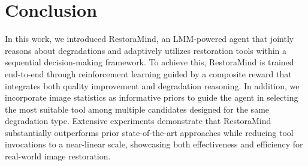 \section{Conclusion}
In this work, we introduced RestoraMind, an LMM-powered agent that jointly reasons about degradations and adaptively utilizes restoration tools within a sequential decision-making framework. To achieve this, RestoraMind is trained end-to-end through reinforcement learning guided by a composite reward that integrates both quality improvement and degradation reasoning. In addition, we incorporate image statistics as informative priors to guide the agent in selecting the most suitable tool among multiple candidates designed for the same degradation type. Extensive experiments demonstrate that RestoraMind substantially outperforms prior state-of-the-art approaches while reducing tool invocations to a near-linear scale, showcasing both effectiveness and efficiency for real-world image restoration.